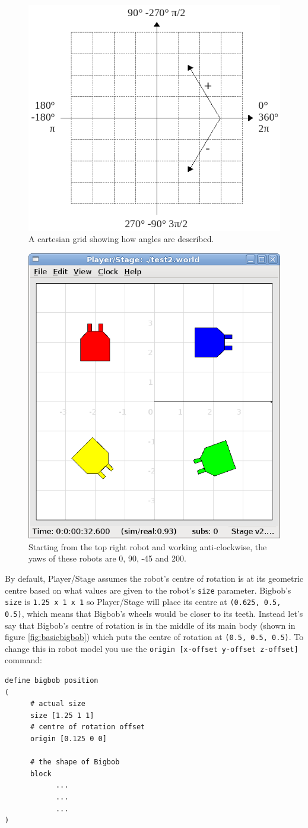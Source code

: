 \documentclass[a4paper]{report}
\newcommand{\plst}{Player/Stage\xspace}
\begin{document}
\begin{figure}
	\centering
	\includegraphics[width=0.5\linewidth]{./pics/robot_building/cartesian_grid_wpolars.png} 
	\caption{A cartesian grid showing how angles are described.}
	\label{fig:emptycartgrid}
\end{figure}

\begin{figure}
	\centering
	\includegraphics[width=0.6\linewidth]{./pics/robot_building/yaw_examples.png} 
	\caption{Starting from the top right robot and working anti-clockwise, the yaws of these robots are 0, 90, -45 and 200.}
	\label{fig:yaws}
\end{figure}

By default, \plst assumes the robot's centre of rotation is at its geometric centre based on what values are given to the robot's \verb|size| parameter. Bigbob's \verb|size| is \verb|1.25 x 1 x 1| so \plst will place its centre at \verb|(0.625, 0.5, 0.5)|, which means that Bigbob's wheels would be closer to its teeth. Instead let's say that Bigbob's centre of rotation is in the middle of its main body (shown in figure \ref{fig:basicbigbob}) which puts the centre of rotation at \verb|(0.5, 0.5, 0.5)|. To change this in robot model you use the \verb|origin [x-offset y-offset z-offset]| command:
\begin{verbatim}
define bigbob position
(
      # actual size
      size [1.25 1 1]
      # centre of rotation offset
      origin [0.125 0 0]

      # the shape of Bigbob
      block
            ...
            ...
            ...
)
\end{verbatim}
\end{document}
